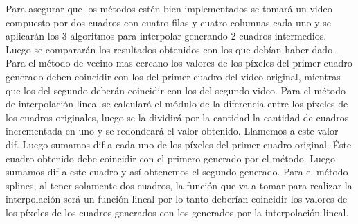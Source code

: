     Para asegurar que los métodos estén bien implementados se tomará un video compuesto por dos cuadros con cuatro filas y cuatro columnas cada uno y se aplicarán los 3 algoritmos para interpolar generando 2 cuadros intermedios. Luego se compararán los resultados obtenidos con los que debían haber dado. Para el método de vecino mas cercano los valores de los píxeles del primer cuadro generado deben coincidir con los del primer cuadro del video original, mientras que los del segundo deberán coincidir con los del segundo video. Para el método de interpolación lineal se calculará el módulo de la diferencia entre los píxeles de los cuadros originales, luego se la dividirá por la cantidad la cantidad de cuadros incrementada en uno y se redondeará el valor obtenido. Llamemos a este valor dif. Luego sumamos dif a cada uno de los píxeles del primer cuadro original. Éste cuadro obtenido debe coincidir con el primero generado por el método. Luego sumamos dif a este cuadro y así obtenemos el segundo generado. Para el método splines, al tener solamente dos cuadros, la función que va a tomar para realizar la interpolación será un función lineal por lo tanto deberían coincidir los valores de los píxeles de los cuadros generados con los generados por la interpolación lineal.
